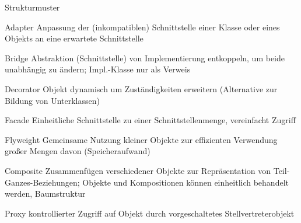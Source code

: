 \documentclass[a4paper]{article}
\begin{document}
\begin{multicols}{3}
  Strukturmuster
  \begin{description*}
    \item[Adapter] Anpassung der (inkompatiblen) Schnittstelle einer Klasse oder eines Objekts an eine erwartete Schnittstelle
    \item[Bridge] Abstraktion (Schnittstelle) von Implementierung entkoppeln, um beide unabhängig zu ändern; Impl.-Klasse nur als Verweis
    \item[Decorator] Objekt dynamisch um Zuständigkeiten erweitern (Alternative zur Bildung von Unterklassen)
    \item[Facade] Einheitliche Schnittstelle zu einer Schnittstellenmenge, vereinfacht Zugriff
    \item[Flyweight] Gemeinsame Nutzung kleiner Objekte zur effizienten Verwendung großer Mengen davon (Speicheraufwand)
    \item[Composite] Zusammenfügen verschiedener Objekte zur Repräsentation von Teil-Ganzes-Beziehungen; Objekte und Kompositionen können einheitlich behandelt werden, Baumstruktur
    \item[Proxy] kontrollierter Zugriff auf Objekt durch vorgeschaltetes Stellvertreterobjekt
  \end{description*}


\end{multicols}
\end{document}
